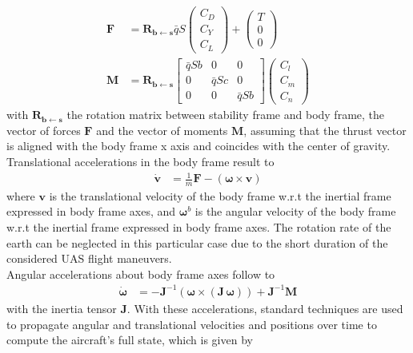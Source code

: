 \documentclass{ifacconf}
\newcommand{\mbf}[1]{\mathbf{#1}}
\providecommand{\mbf}[1]{\mathbf{#1}}
\newcommand{\Rbs}{{\ensuremath{\mbf{R_{b \leftarrow  s}}}}}
\newcommand{\qbar}{\ensuremath{\bar{q}}}
\begin{document}
\begin{align}
\label{eq:coeff2realforcesandmoments}
\mathbf{F}
&=
\Rbs
\bar{q}
S
\begin{pmatrix}
C_D \\ 
C_Y \\
C_L 
\end{pmatrix}
+
\begin{pmatrix}
T \\ 
0 \\
0 
\end{pmatrix}\\
\mathbf{M}
&=
\Rbs
\begin{bmatrix}
\qbar S b & 0 & 0 \\
0 & \qbar S c & 0 \\
0& 0 & \qbar S b 
\end{bmatrix}
\begin{pmatrix}
C_l \\ 
C_m \\
C_n 
\end{pmatrix}
\end{align}
with $\Rbs$ the rotation matrix between stability frame and body frame, the vector of forces $\mathbf{F}$ and the vector of moments $\mathbf{M}$, assuming that the thrust vector is aligned with the body frame x axis and coincides with the center of gravity.
Translational accelerations in the body frame result to
\begin{align}
\label{eq:forces2accelerations}
\dot{\mathbf{v}} &= \frac{1}{m}\mathbf{F} 
- (\mathbf{\omega} \times \mathbf{v})
\end{align}
where $\mathbf{v}$ is the translational velocity of the body frame w.r.t the inertial frame expressed in body frame axes, 
and $\mathbf{\omega}^{b}$ is the angular velocity of the body frame w.r.t the inertial frame expressed in body frame axes. The rotation rate of the earth can be neglected in this particular case due to the short duration of the considered UAS flight maneuvers.\\
Angular accelerations about body frame axes follow to
\begin{align}
\dot{\mathbf{\omega}} &= -\mathbf{J}^{-1} ({\mathbf{\omega}} 
\times 
(\mathbf{J} \,{\mathbf{\omega}}))
+ \mathbf{J}^{-1} 
\mathbf{M}
\end{align}
with the inertia tensor $\mathbf{J}$.
With these accelerations, standard techniques are used to propagate angular and translational velocities and positions over time to compute the aircraft's full state, which is given by
\end{document}
